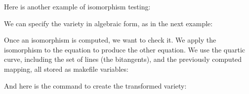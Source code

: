\bigskip


Here is another example of isomorphism testing:






\bigskip


We can specify the variety in algebraic form, as in the next example:






\bigskip


Once an isomorphism is computed, we want to check it. 
We apply the isomorphism to the equation to produce the other equation. 
We use the quartic curve, 
including the set of lines (the bitangents),  
and the previously computed mapping, all stored as makefile variables:





And here is the command to create the transformed variety:




\bigskip



